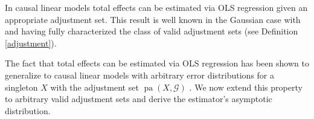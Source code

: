 \documentclass[11pt,a4paper]{article}
\newtheorem{Lemma}[Satz]{Lemma}
\theoremstyle{definition}
\theoremstyle{remark}
\DeclareMathOperator{\pa}{pa}
\newcommand{\g}[1][G]{\mathcal{#1}}
\newcommand{\vsp}{\vspace{.2cm}}
\begin{document}
In causal linear models total effects can be estimated via OLS regression given an appropriate adjustment set. This result is well known in the Gaussian case with \citet{shpitser2010validity} and \citet{perkovic16} having fully characterized the class of valid adjustment sets (see Definition \ref{adjustment}). 

The fact that total effects can be estimated via OLS regression has been shown to generalize to causal linear models with arbitrary error distributions for a singleton $X$ with the adjustment set $\pa(X,\g)$ \citep[Proposition 3.1 from the supplement of][]{nandy2017estimating}. We now extend this property to arbitrary valid adjustment sets and derive the estimator's asymptotic distribution. \\
















\end{document}
